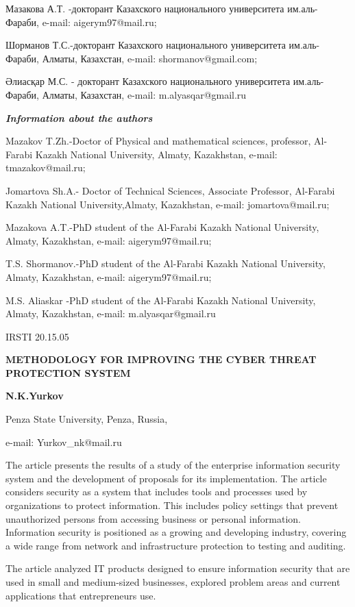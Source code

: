 Мазакова А.Т. -докторант Казахского национального университета
им.аль-Фараби, e-mail: aigerym97@mail.ru;

Шорманов Т.С.-докторант Казахского национального университета
им.аль-Фараби, Алматы, Казахстан, e-mail: shormanov@gmail.com;

Әлиасқар М.С. - докторант Казахского национального университета
им.аль-Фараби, Алматы, Казахстан, e-mail: m.alyasqar@gmail.ru

\emph{\textbf{Information about the authors}}

Mazakov T.Zh.-Doctor of Physical and mathematical sciences, professor,
Al-Farabi Kazakh National University, Almaty, Kazakhstan, e-mail:
tmazakov@mail.ru;

Jomartova Sh.A.- Doctor of Technical Sciences, Associate Professor,
Al-Farabi Kazakh National University,Almaty, Kazakhstan, e-mail:
jomartova@mail.ru;

Mazakova A.T.-PhD student of the Al-Farabi Kazakh National University,
Almaty, Kazakhstan, e-mail: aigerym97@mail.ru;

T.S. Shormanov.-PhD student of the Al-Farabi Kazakh National University,
Almaty, Kazakhstan, e-mail: aigerym97@mail.ru;

M.S. Aliaskar -PhD student of the Al-Farabi Kazakh National University,
Almaty, Kazakhstan, e-mail: m.alyasqar@gmail.ru

IRSTI 20.15.05

\textbf{METHODOLOGY FOR IMPROVING THE CYBER THREAT PROTECTION SYSTEM}

\textbf{N.K.Yurkov}

Penza State University, Penza, Russia,

e-mail: Yurkov\_nk@mail.ru

The article presents the results of a study of the enterprise
information security system and the development of proposals for its
implementation. The article considers security as a system that includes
tools and processes used by organizations to protect information. This
includes policy settings that prevent unauthorized persons from
accessing business or personal information. Information security is
positioned as a growing and developing industry, covering a wide range
from network and infrastructure protection to testing and auditing.

The article analyzed IT products designed to ensure information security
that are used in small and medium-sized businesses, explored problem
areas and current applications that entrepreneurs use.

